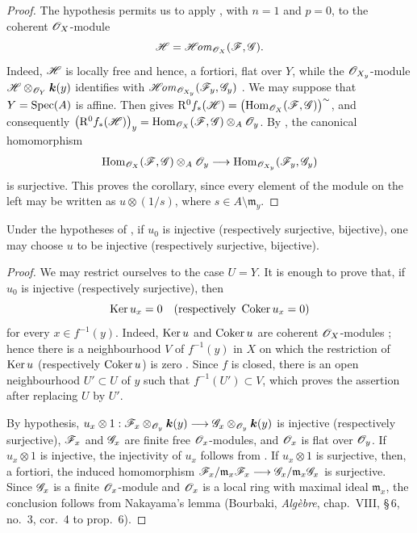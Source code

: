 \begin{proof}
The hypothesis permits us to apply , with $n=1$
and $p=0$, to the coherent $\mathscr{O}_X$-module
\[
  \mathscr{H}=\mathscr{H}\!\mathit{om}_{\mathscr{O}_X}(\mathscr{F},\mathscr{G}).
\]
Indeed, $\mathscr{H}$ is locally free and hence, a fortiori, flat over
$Y$, while the $\mathscr{O}_{X_y}$-module
$\mathscr{H}\otimes_{\mathscr{O}_Y}\boldsymbol{k}(y)$ identifies with
$\mathscr{H}\!\mathit{om}_{\mathscr{O}_{X_y}}(\mathscr{F}_y,\mathscr{G}_y)$
.  We may suppose that $Y=\operatorname{Spec}(A)$ is affine.
Then  gives $\mathrm{R}^0f_*(\mathscr{H})
=
\bigl(\operatorname{Hom}_{\mathscr{O}_X}(\mathscr{F},\mathscr{G})\bigr)^{\sim}$,
and consequently $\bigl(\mathrm{R}^0f_*(\mathscr{H})\bigr)_y
=
\operatorname{Hom}_{\mathscr{O}_X}(\mathscr{F},\mathscr{G})
\otimes_A\mathscr{O}_y$.
By , the canonical homomorphism
\[
  \operatorname{Hom}_{\mathscr{O}_X}(\mathscr{F},\mathscr{G})
    \otimes_A\mathscr{O}_y
  \longrightarrow
  \operatorname{Hom}_{\mathscr{O}_{X_y}}(\mathscr{F}_y,\mathscr{G}_y)
\]
is surjective.  This proves the corollary, since every element of
the module on the left may be written as $u\otimes(1/s)$, where
$s\in A\setminus\mathfrak m_y$.
\end{proof}

\begin{corollary}[4.6.3]
\label{III.4.6.3}
Under the hypotheses of , if $u_0$ is injective
\textup{(respectively} surjective, bijective), one may choose $u$ to be
injective (respectively surjective, bijective).
\end{corollary}

\begin{proof}
We may restrict ourselves to the case $U=Y$.  It is enough to prove
that, if $u_0$ is injective (respectively surjective), then
\[
  \operatorname{Ker} u_x=0
  \quad\text{(respectively }\operatorname{Coker} u_x=0\text{)}
\]
for every $x\in f^{-1}(y)$.  Indeed, $\operatorname{Ker} u$ and $\operatorname{Coker} u$ are
coherent $\mathscr{O}_X$-modules ; hence there is a
neighbourhood $V$ of $f^{-1}(y)$ in $X$ on which the restriction of
$\operatorname{Ker} u$ (respectively $\operatorname{Coker} u$) is zero .
Since $f$ is closed, there is an open neighbourhood
$U'\subset U$ of $y$ such that $f^{-1}(U')\subset V$, which proves
the assertion after replacing $U$ by $U'$.


By hypothesis, $u_x\otimes1:
\mathscr{F}_x\otimes_{\mathscr{O}_y}\boldsymbol{k}(y)
\longrightarrow
\mathscr{G}_x\otimes_{\mathscr{O}_y}\boldsymbol{k}(y)$
is injective (respectively surjective), $\mathscr{F}_x$ and $\mathscr{G}_x$
are finite free $\mathscr{O}_x$-modules, and $\mathscr{O}_x$ is flat over
$\mathscr{O}_y$.  If $u_x\otimes1$ is injective, the injectivity of $u_x$
follows from .  If $u_x\otimes1$ is surjective,
then, a fortiori, the induced homomorphism $\mathscr{F}_x/\mathfrak m_x\mathscr{F}_x
\longrightarrow
\mathscr{G}_x/\mathfrak m_x\mathscr{G}_x$
is surjective.  Since $\mathscr{G}_x$ is a finite $\mathscr{O}_x$-module and
$\mathscr{O}_x$ is a local ring with maximal ideal $\mathfrak m_x$, the
conclusion follows from Nakayama's lemma (Bourbaki,
\emph{Alg\`ebre}, chap.~VIII, \S\,6, no.~3, cor.~4 to prop.~6).
\end{proof}

